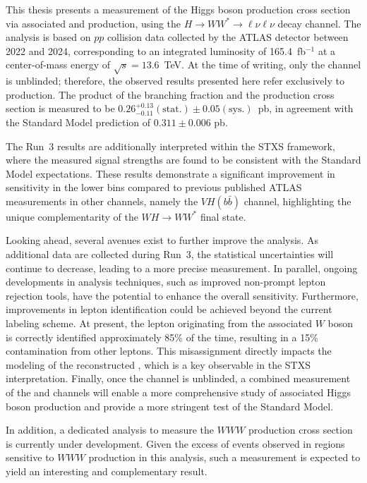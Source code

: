 This thesis presents a measurement of the Higgs boson production cross section via associated \wh{} and \zh{} production, using the $H \to WW^{*} \to \ell\nu\ell\nu$ decay channel. The analysis is based on $pp$ collision data collected by the ATLAS detector between 2022 and 2024, corresponding to an integrated luminosity of 165.4~fb$^{-1}$ at a center-of-mass energy of $\sqrt{s} = 13.6$~TeV. At the time of writing, only the \wh{} channel is unblinded; therefore, the observed results presented here refer exclusively to \wh{} production. The product of the \hww{} branching fraction and the \wh{} production cross section is measured to be $0.26^{+0.13}_{-0.11}(\text{stat.})\pm{0.05}(\text{sys.})$~pb, in agreement with the Standard Model prediction of $0.311\pm0.006$ pb.

The Run~3 results are additionally interpreted within the STXS framework, where the measured signal strengths are found to be consistent with the Standard Model expectations. These results demonstrate a significant improvement in sensitivity in the lower \ptw{} bins compared to previous published ATLAS measurements in other channels, namely the $VH(b\bar{b})$ channel, highlighting the unique complementarity of the $WH \to WW^{*}$ final state.

Looking ahead, several avenues exist to further improve the analysis. As additional data are collected during Run~3, the statistical uncertainties will continue to decrease, leading to a more precise measurement. In parallel, ongoing developments in analysis techniques, such as improved non-prompt lepton rejection tools, have the potential to enhance the overall sensitivity. Furthermore, improvements in lepton identification could be achieved beyond the current labeling scheme. At present, the lepton originating from the associated $W$ boson is correctly identified approximately 85\% of the time, resulting in a 15\% contamination from other leptons. This misassignment directly impacts the modeling of the reconstructed \ptr{}, which is a key observable in the STXS interpretation. Finally, once the \zh{} channel is unblinded, a combined measurement of the \wh{} and \zh{} channels will enable a more comprehensive study of associated Higgs boson production and provide a more stringent test of the Standard Model.

In addition, a dedicated analysis to measure the $WWW$ production cross section is currently under development. Given the excess of events observed in regions sensitive to $WWW$ production in this analysis, such a measurement is expected to yield an interesting and complementary result.
